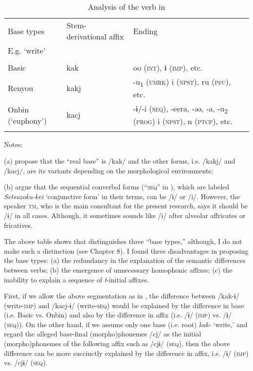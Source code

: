 \begin{table}
\caption{\label{tab:key:68}Analysis of the verb in \citet{UchimaEtAl1976}}

\begin{tabular}{lll}
\lsptoprule
Base types  &  Stem-derivational affix  & Ending\\

  E.g. ‘write’\\
\midrule                                                                                                                                             \\
Basic             &   kak &   oo (\textsc{int}), ɨ (\textsc{imp}), etc.                                                                                              \\
Renyou            &  kakj & -u\textsubscript{1} (\textsc{umrk})  i (\textsc{npst}), ru (\textsc{pfc}), etc.                                                        \\
Onbin (‘euphony’) & kacj  &-ɨ/-i (\textsc{seq}), -eera, -əə, -a, -u\textsubscript{2} (\textsc{prog})  i (\textsc{npst}), n (\textsc{ptcp}), etc.       \\
\lspbottomrule
\end{tabular}
Notes:

(a) \citet[78]{UchimaEtAl1976} propose that the “real base” is /kak/ and the other forms, i.e. /kakj/ and /kacj/, are its variants depending on the morphological environments;

(b) \citet[91-92]{UchimaEtAl1976} argue that the sequential converbal forms (“\textsc{seq}” in ), which are labeled \textit{Setsuzoku-kei} ‘conjunctive form’ in their terms, can be /ɨ/ or /i/. However, the speaker \textsc{tm}, who is the main consultant for the present research, says it should be /ɨ/ in all cases. Although, it sometimes sounds like /i/ after alveolar affricates or fricatives.
\end{table}

The above table shows that \citet{UchimaEtAl1976} distinguishes three “base types,” although, I do not make such a distinction (see Chapter 8). I found three disadvantages in proposing the base types: (a) the redundancy in the explanation of the semantic differences between verbs; (b) the emergence of unnecessary homophonic affixes; (c) the inability to explain a sequence of \textit{t}-initial affixes.

First, if we allow the above segmentation as in , the difference between /kak-ɨ/ (write-\textsc{imp}) and /kacj-ɨ/ (write-\textsc{seq}) would be explained by the difference in base (i.e. Basic vs. Onbin) and also by the difference in affix (i.e. /ɨ/ (\textsc{imp}) vs. /ɨ/ (\textsc{seq})). On the other hand, if we assume only one base (i.e. root) \textit{kak-} ‘write,’ and regard the alleged base-final (morpho)phonemes /cj/ as the initial (morpho)phonemes of the following affix such as /cjɨ/ (\textsc{seq}), then the above difference can be more succinctly explained by the difference in affix, i.e. /ɨ/ (\textsc{imp}) vs. /cjɨ/ (\textsc{seq}).

